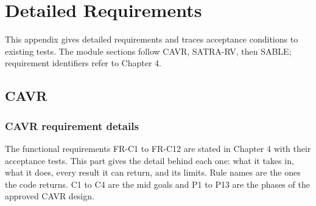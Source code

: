 \chapter{Detailed Requirements}\label{app:cavr-requirements}
This appendix gives detailed requirements and traces acceptance conditions to existing tests. The module sections follow CAVR, SATRA-RV, then SABLE; requirement identifiers refer to Chapter 4.

\section*{CAVR}
\subsection*{CAVR requirement details}
The functional requirements FR-C1 to FR-C12 are stated in Chapter 4 with their acceptance tests. This part gives the detail behind each one: what it takes in, what it does, every result it can return, and its limits. Rule names are the ones the code returns. C1 to C4 are the mid goals and P1 to P13 are the phases of the approved CAVR design.

